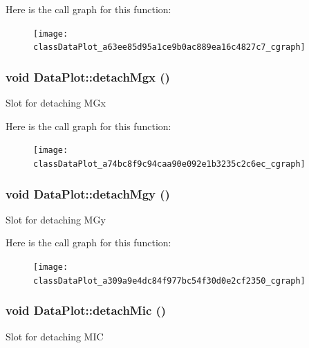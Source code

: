 Here is the call graph for this function:\nopagebreak
\begin{figure}[H]
\begin{center}
\leavevmode
\texttt{[image: classDataPlot\_a63ee85d95a1ce9b0ac889ea16c4827c7\_cgraph]}
\end{center}
\end{figure}


\hypertarget{classDataPlot_a74bc8f9c94caa90e092e1b3235c2c6ec}{
\subsubsection[{detachMgx}]{\setlength{\rightskip}{0pt plus 5cm}void DataPlot::detachMgx ()}}
\label{classDataPlot_a74bc8f9c94caa90e092e1b3235c2c6ec}
Slot for detaching MGx 

Here is the call graph for this function:\nopagebreak
\begin{figure}[H]
\begin{center}
\leavevmode
\texttt{[image: classDataPlot\_a74bc8f9c94caa90e092e1b3235c2c6ec\_cgraph]}
\end{center}
\end{figure}


\hypertarget{classDataPlot_a309a9e4dc84f977bc54f30d0e2cf2350}{
\subsubsection[{detachMgy}]{\setlength{\rightskip}{0pt plus 5cm}void DataPlot::detachMgy ()}}
\label{classDataPlot_a309a9e4dc84f977bc54f30d0e2cf2350}
Slot for detaching MGy 

Here is the call graph for this function:\nopagebreak
\begin{figure}[H]
\begin{center}
\leavevmode
\texttt{[image: classDataPlot\_a309a9e4dc84f977bc54f30d0e2cf2350\_cgraph]}
\end{center}
\end{figure}


\hypertarget{classDataPlot_a42a2f46b248f64482153739201fc7d2b}{
\subsubsection[{detachMic}]{\setlength{\rightskip}{0pt plus 5cm}void DataPlot::detachMic ()}}
\label{classDataPlot_a42a2f46b248f64482153739201fc7d2b}
Slot for detaching MIC 

